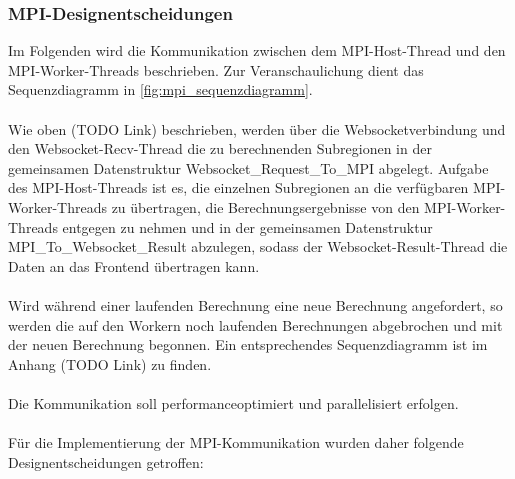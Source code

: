 \subsubsection{MPI-Designentscheidungen}
Im Folgenden wird die Kommunikation zwischen dem MPI-Host-Thread und den MPI-Worker-Threads beschrieben. Zur Veranschaulichung dient das Sequenzdiagramm in \autoref{fig:mpi_sequenzdiagramm}.
\\ \\
Wie oben (TODO Link) beschrieben, werden über die Websocketverbindung und den Websocket-Recv-Thread die zu berechnenden Subregionen in der gemeinsamen Datenstruktur Websocket\_Request\_To\_MPI abgelegt. Aufgabe des MPI-Host-Threads ist es, die einzelnen Subregionen an die verfügbaren MPI-Worker-Threads zu übertragen, die Berechnungsergebnisse von den MPI-Worker-Threads entgegen zu nehmen und in der gemeinsamen Datenstruktur MPI\_To\_Websocket\_Result abzulegen, sodass der Websocket-Result-Thread die Daten an das Frontend übertragen kann.
\\ \\
Wird während einer laufenden Berechnung eine neue Berechnung angefordert, so werden die auf den Workern noch laufenden Berechnungen abgebrochen und mit der neuen Berechnung begonnen. Ein entsprechendes Sequenzdiagramm ist im Anhang (TODO Link) zu finden.
\\ \\
Die Kommunikation soll performanceoptimiert und parallelisiert erfolgen.
\\ \\
Für die Implementierung der MPI-Kommunikation wurden daher folgende Designentscheidungen getroffen:

